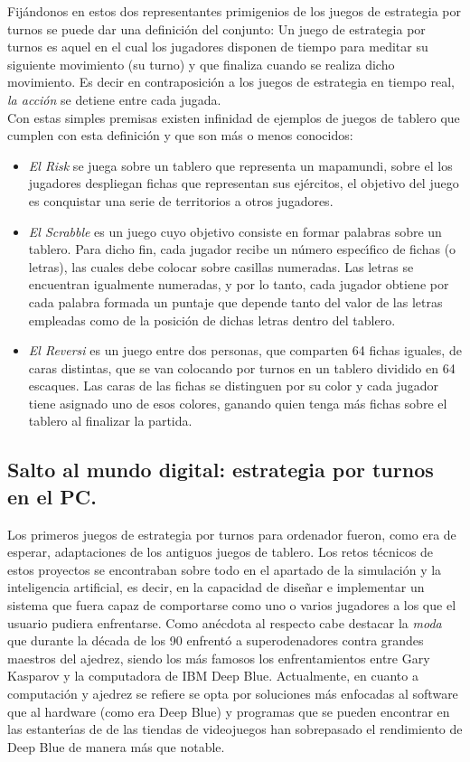 Fij\'andonos en estos dos representantes primigenios de los juegos de estrategia por turnos se puede dar una definici\'on del conjunto: Un juego de estrategia por turnos es aquel en el cual los jugadores disponen de tiempo para meditar su siguiente movimiento (su turno) y que finaliza cuando se realiza dicho movimiento. Es decir en contraposici\'on a los juegos de estrategia en tiempo real, \emph{la acci\'on} se detiene entre cada jugada.
\\
Con estas simples premisas existen infinidad de ejemplos de juegos de tablero que cumplen con esta definici\'on y que son m\'as o menos conocidos: 
\begin{itemize}
	\item \emph{El Risk} se juega sobre un tablero que representa un mapamundi, sobre el los jugadores despliegan fichas que representan sus ej\'ercitos, el objetivo del juego es conquistar una serie de territorios a otros jugadores.
	\item \emph{El Scrabble} es un juego cuyo objetivo consiste en formar palabras sobre un tablero. Para dicho fin, cada jugador recibe un n\'umero espec\'{\i}fico de fichas (o letras), las cuales debe colocar sobre casillas numeradas. Las letras se encuentran igualmente numeradas, y por lo tanto, cada jugador obtiene por cada palabra formada un puntaje que depende tanto del valor de las letras empleadas como de la posici\'on de dichas letras dentro del tablero.
	\item \emph{El Reversi} es un juego entre dos personas, que comparten 64 fichas iguales, de caras distintas, que se van colocando por turnos en un tablero dividido en 64 escaques. Las caras de las fichas se distinguen por su color y cada jugador tiene asignado uno de esos colores, ganando quien tenga m\'as fichas sobre el tablero al finalizar la partida.
\end{itemize}

\subsection{Salto al mundo digital: estrategia por turnos en el PC.}

Los primeros juegos de estrategia por turnos para ordenador fueron, como era de esperar, adaptaciones de los antiguos juegos de tablero. Los retos t\'ecnicos de estos proyectos  se encontraban sobre todo en el apartado de la simulaci\'on y la inteligencia artificial, es decir, en la capacidad de dise\~nar e implementar un sistema que fuera capaz de comportarse como uno o varios jugadores a los que el usuario pudiera enfrentarse. Como an\'ecdota al respecto cabe destacar la \textit{moda} que durante la d\'ecada de los 90 enfrent\'o a superodenadores contra grandes maestros del ajedrez, siendo los m\'as famosos los enfrentamientos entre Gary Kasparov y la computadora de IBM Deep Blue. Actualmente, en cuanto a computaci\'on y ajedrez se refiere se opta por soluciones m\'as enfocadas al software que al hardware (como era Deep Blue) y programas que se pueden encontrar en las estanter\'{\i}as de de las tiendas de videojuegos han sobrepasado el rendimiento de Deep Blue de manera m\'as que notable.\\

